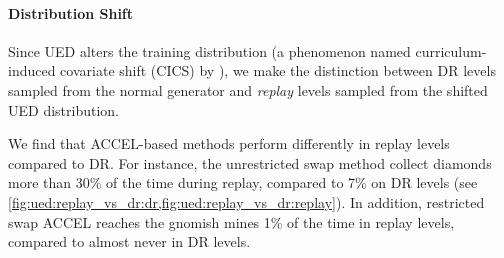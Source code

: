 \documentclass{article}
\theoremstyle{plain}
\theoremstyle{definition}
\theoremstyle{remark}
\begin{document}

\paragraph{Distribution Shift}
Since UED alters the training distribution (a phenomenon named curriculum-induced covariate shift (CICS) by \citet{jiang2022Grounding}), we make the distinction between DR levels sampled from the normal generator and \textit{replay} levels sampled from the shifted UED distribution.

We find that ACCEL-based methods perform differently in replay levels compared to DR. For instance, the unrestricted swap method collect diamonds more than 30\% of the time during replay, compared to 7\% on DR levels (see \cref{fig:ued:replay_vs_dr:dr,fig:ued:replay_vs_dr:replay}). In addition, restricted swap ACCEL reaches the gnomish mines 1\% of the time in replay levels, compared to almost never in DR levels. 


\end{document}
